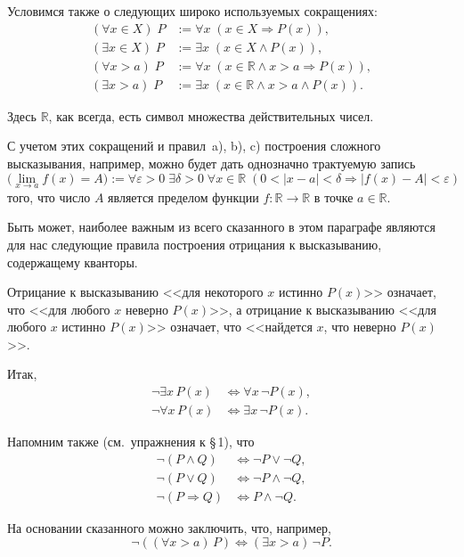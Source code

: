 Условимся также о следующих широко используемых сокращениях:
\begin{align*}
  (\forall x \in X)\; P &:= \forall x\; (x \in X \Rightarrow P(x)), \\
  (\exists x \in X)\; P &:= \exists x\; (x \in X \land P(x)), \\
  (\forall x > a)\; P &:= \forall x\; (x \in \mathbb{R} \land x > a \Rightarrow P(x)), \\
  (\exists x > a)\; P &:= \exists x\; (x \in \mathbb{R} \land x > a \land P(x)).
\end{align*}

Здесь $\mathbb{R}$, как всегда, есть символ множества действительных чисел.

С учетом этих сокращений и правил~a), b), c) построения сложного
высказывания, например, можно будет дать однозначно трактуемую запись
\[
  \bigl(\lim_{x \to a} f(x) = A\bigr) := \forall \varepsilon > 0\; \exists \delta > 0\;
  \forall x \in \mathbb{R}\; (0 < |x - a| < \delta \Rightarrow |f(x) - A| < \varepsilon)
\]
того, что число $A$ является пределом функции $f \colon \mathbb{R} \to \mathbb{R}$ в точке $a \in \mathbb{R}$.

Быть может, наиболее важным из всего сказанного в этом параграфе
являются для нас следующие правила построения отрицания к высказыванию,
содержащему кванторы.

Отрицание к высказыванию <<для некоторого $x$ истинно $P(x)$>> означает,
что <<для любого $x$ неверно $P(x)$>>, а отрицание к высказыванию <<для любого
$x$ истинно $P(x)$>> означает, что <<найдется $x$, что неверно $P(x)$>>.

Итак,
\begin{align*}
  \neg \exists x\, P(x) &\Leftrightarrow \forall x\, \neg P(x), \\
  \neg \forall x\, P(x) &\Leftrightarrow \exists x\, \neg P(x).
\end{align*}

Напомним также (см.\ упражнения к \S\,1), что
\begin{align*}
  \neg (P \land Q) &\Leftrightarrow \neg P \lor \neg Q, \\
  \neg (P \lor Q) &\Leftrightarrow \neg P \land \neg Q, \\
  \neg (P \Rightarrow Q) &\Leftrightarrow P \land \neg Q.
\end{align*}

На основании сказанного можно заключить, что, например,
\[
  \neg ((\forall x > a)\, P) \Leftrightarrow (\exists x > a)\, \neg P.
\]

